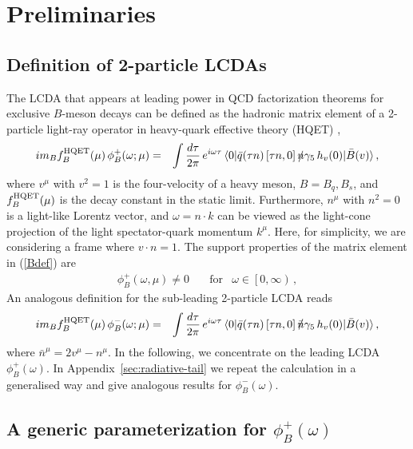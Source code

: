 \documentclass[a4paper,11pt]{article}
\begin{document}
\section{Preliminaries}

\subsection{Definition of 2-particle LCDAs}

The LCDA that appears at leading power in QCD factorization theorems for exclusive $B$-meson decays can be defined as the hadronic matrix element 
of a 2-particle light-ray operator in heavy-quark effective theory (HQET)
\cite{Grozin:1996pq},
\begin{eqnarray}
 i m_B f_B^{\rm HQET}(\mu) \, 
  \phi_B^+(\omega;\mu) &=& \int \frac{d\tau}{2\pi} \, e^{i  \omega  \tau } \, \langle 0| \bar q( \tau n) \, [\tau n,0] \, \slashed n \gamma_5 \, h_v(0)|\bar{B}(v)\rangle  \,,
  \label{Bdef}
\end{eqnarray}
where $v^\mu$ with $v^2=1$ is the four-velocity of a heavy meson, $B=B_q,B_s$, and $f_B^{\rm HQET}(\mu)$ is the decay constant in the static limit. 
Furthermore, $n^\mu$ with $n^2=0$ is a light-like Lorentz vector, and 
$\omega= n \cdot k$ can be viewed as 
the light-cone projection of the 
light spectator-quark momentum $k^\mu$.
Here, for simplicity, we are considering a frame where $v \cdot n =1$.
The support properties of the matrix element 
in (\ref{Bdef}) are   
\begin{eqnarray}
  \phi_B^+(\omega,\mu) \neq 0 \quad & \mbox{for} & \omega \in \left[0,\infty\right) \,,
\end{eqnarray}
%
An analogous definition for the sub-leading 2-particle LCDA reads
\begin{eqnarray}
	i m_B f_B^{\rm HQET}(\mu) \, 
	\phi_B^-(\omega;\mu) &=& \int \frac{d\tau}{2\pi} \, e^{i  \omega  \tau } \, \langle 0| \bar q( \tau n) \, [\tau n,0] \, \slashed{\bar n} \gamma_5 \, h_v(0)|\bar{B}(v)\rangle  \,,
	\label{Bmdef}
\end{eqnarray}
where $\bar n^\mu= 2 v^\mu - n^\mu$. In the following, we concentrate on the leading LCDA $\phi_B^+(\omega)$. 
In Appendix~\ref{sec:radiative-tail} we repeat the calculation in a generalised way and give analogous results for $\phi_B^-(\omega)$.


\subsection{A generic parameterization for \texorpdfstring{$\phi_B^+(\omega)$}{phi+}}
\end{document}
